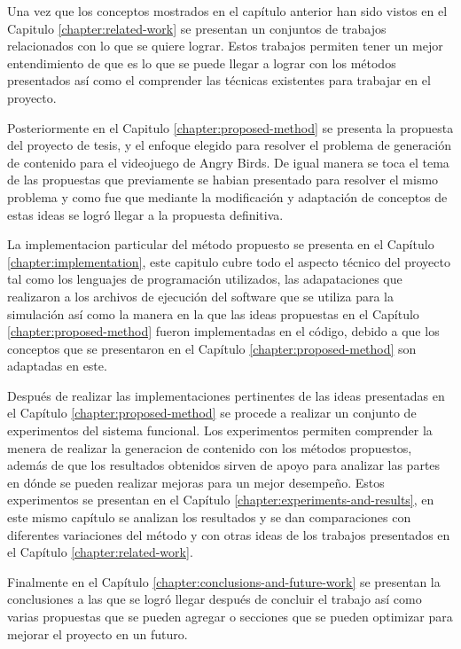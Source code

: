 Una vez que los conceptos mostrados en el capítulo anterior han sido
vistos en el Capitulo \ref{chapter:related-work} se presentan un
conjuntos de trabajos relacionados con lo que se quiere lograr. Estos trabajos
permiten tener un mejor entendimiento de que es lo que se puede llegar a lograr
con los métodos presentados así como el comprender las técnicas 
existentes para trabajar en el proyecto.

Posteriormente en el Capitulo \ref{chapter:proposed-method} se presenta la
propuesta del proyecto de tesis, y el enfoque elegido para resolver el 
problema de generación de contenido para el
videojuego de Angry Birds. De igual manera se toca el tema de las 
propuestas que previamente se habian presentado para resolver el mismo 
problema y como fue que mediante la modificación y adaptación de conceptos
de estas ideas se logró llegar a la propuesta definitiva.

La implementacion particular del método propuesto se presenta en el Capítulo
\ref{chapter:implementation}, este capitulo cubre todo el aspecto técnico del
proyecto tal como los lenguajes de programación utilizados, las adapataciones
que realizaron a los archivos de ejecución del software que se utiliza para la
simulación así como la manera en la que las ideas propuestas en el Capítulo
\ref{chapter:proposed-method} fueron implementadas en el código, debido a que
los conceptos que se presentaron en el Capítulo \ref{chapter:proposed-method}
son adaptadas en este.

Después de realizar las implementaciones pertinentes de las ideas presentadas en
el Capítulo \ref{chapter:proposed-method} se procede a realizar un conjunto de
experimentos del sistema funcional. Los experimentos permiten comprender la
menera de realizar la generacion de contenido con los métodos
propuestos, además de que los resultados obtenidos sirven de apoyo para analizar
las partes en dónde se pueden realizar mejoras para un mejor desempeño. Estos
experimentos se presentan en el Capítulo \ref{chapter:experiments-and-results},
en este mismo capítulo se analizan los resultados y se dan comparaciones con
diferentes variaciones del método y con otras ideas de los trabajos presentados
en el Capítulo \ref{chapter:related-work}.

Finalmente en el Capítulo \ref{chapter:conclusions-and-future-work} se presentan
la conclusiones a las que se logró llegar después de concluir el trabajo así
como varias propuestas que se pueden agregar o secciones que se pueden optimizar
para mejorar el proyecto en un futuro.

